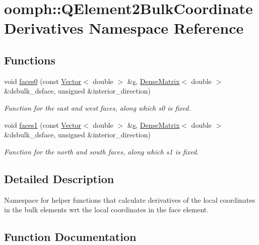 \hypertarget{namespaceoomph_1_1QElement2BulkCoordinateDerivatives}{}\section{oomph\+:\+:Q\+Element2\+Bulk\+Coordinate\+Derivatives Namespace Reference}
\label{namespaceoomph_1_1QElement2BulkCoordinateDerivatives}
\subsection*{Functions}
\begin{DoxyCompactItemize}
\item 
void \hyperlink{namespaceoomph_1_1QElement2BulkCoordinateDerivatives_a94c0ba8cb61bc07bdf826604637d0a3b}{faces0} (const \hyperlink{classoomph_1_1Vector}{Vector}$<$ double $>$ \&\hyperlink{cfortran_8h_ab7123126e4885ef647dd9c6e3807a21c}{s}, \hyperlink{classoomph_1_1DenseMatrix}{Dense\+Matrix}$<$ double $>$ \&dsbulk\+\_\+dsface, unsigned \&interior\+\_\+direction)
\begin{DoxyCompactList}\small\item\em Function for the east and west faces, along which s0 is fixed. \end{DoxyCompactList}\item 
void \hyperlink{namespaceoomph_1_1QElement2BulkCoordinateDerivatives_a07953f5dbe4f1e51b98e2a37282c3458}{faces1} (const \hyperlink{classoomph_1_1Vector}{Vector}$<$ double $>$ \&\hyperlink{cfortran_8h_ab7123126e4885ef647dd9c6e3807a21c}{s}, \hyperlink{classoomph_1_1DenseMatrix}{Dense\+Matrix}$<$ double $>$ \&dsbulk\+\_\+dsface, unsigned \&interior\+\_\+direction)
\begin{DoxyCompactList}\small\item\em Function for the north and south faces, along which s1 is fixed. \end{DoxyCompactList}\end{DoxyCompactItemize}


\subsection{Detailed Description}
Namespace for helper functions that calculate derivatives of the local coordinates in the bulk elements wrt the local coordinates in the face element. 

\subsection{Function Documentation}
\mbox{\label{namespaceoomph_1_1QElement2BulkCoordinateDerivatives_a94c0ba8cb61bc07bdf826604637d0a3b}} 
